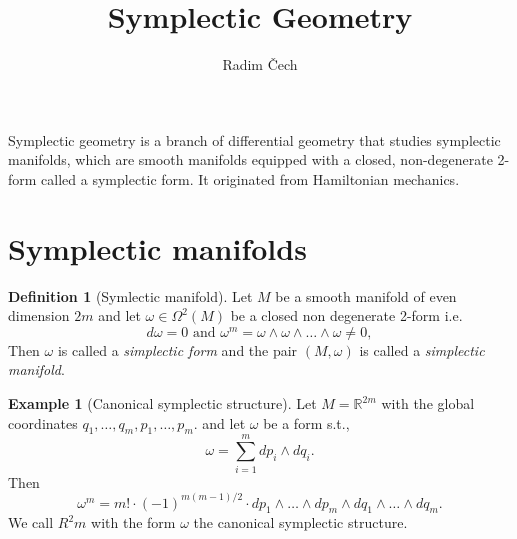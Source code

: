 \documentclass{article}
\title{Symplectic Geometry}
\author{Radim Čech}
\numberwithin{theorem}{section}
\theoremstyle{definition}
\newtheorem{definition}[theorem]{Definition}
\newtheorem{example}[theorem]{Example}
\begin{document}
\maketitle

\noindent Symplectic geometry is a branch of differential geometry that studies symplectic manifolds, which are smooth manifolds equipped with a closed, non-degenerate 2-form called a symplectic form. It originated from Hamiltonian mechanics.

\section{Symplectic manifolds}
\begin{definition}[Symlectic manifold]
    Let $M$ be a smooth manifold of even dimension $2m$ and let $\omega \in \Omega^2(M)$ be a closed non degenerate 2-form i.e.
    \begin{equation*}
        d\omega = 0 \text{ and } \omega^m = \omega \wedge \omega \wedge \dots \wedge \omega \not = 0,
    \end{equation*}
    Then $\omega$ is called a \textit{simplectic form} and the pair $(M, \omega)$ is called a \textit{simplectic manifold}.
\end{definition}

\begin{example}[Canonical symplectic structure]
    Let $M = \mathbb{R}^{2m}$ with the global coordinates ${q_1, \dots, q_m, p_1, \dots, p_m}$. and let $\omega$ be a form s.t., 
    \begin{equation*}
        \omega = \sum_{i=1}^m dp_i \wedge dq_i.
    \end{equation*}
    Then 
    \begin{equation}\label{eqNonDegen}
        \omega^m = m! \cdot (-1)^{m(m-1)/2} \cdot dp_1 \wedge \dots \wedge dp_m \wedge dq_1 \wedge \dots \wedge dq_m.
    \end{equation}
    We call $R^2m$ with the form $\omega$ the canonical symplectic structure.
\end{example}
\end{document}
